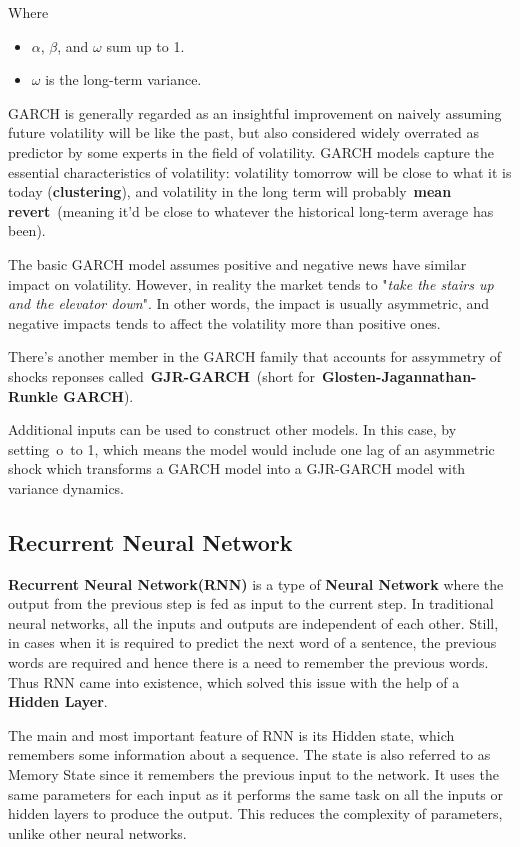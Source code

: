 \documentclass{ieeeojies}
\begin{document}
Where
\begin{itemize}
    \item $\alpha$, $\beta$, and $\omega$ sum up to 1.
    \item $\omega$ is the long-term variance.
\end{itemize}

GARCH is generally regarded as an insightful improvement on naively assuming future volatility will be like the past, but also considered widely overrated as predictor by some experts in the field of volatility. GARCH models capture the essential characteristics of volatility: volatility tomorrow will be close to what it is today (\textbf{clustering}), and volatility in the long term will probably \textbf{mean revert} (meaning it'd be close to whatever the historical long-term average has been). 

The basic GARCH model assumes positive and negative news have similar impact on volatility. However, in reality the market tends to "\textit{take the stairs up and the elevator down}". In other words, the impact is usually asymmetric, and negative impacts tends to affect the volatility more than positive ones.

There's another member in the GARCH family that accounts for assymmetry of shocks reponses called \textbf{GJR-GARCH} (short for \textbf{Glosten-Jagannathan-Runkle GARCH}).

Additional inputs can be used to construct other models. In this case, by setting o to 1, which means the model would include one lag of an asymmetric shock which transforms a GARCH model into a GJR-GARCH model with variance dynamics.
\subsection{Recurrent Neural Network}
\textbf{Recurrent Neural Network(RNN)} is a type of \textbf{Neural Network} where the output from the previous step is fed as input to the current step. In traditional neural networks, all the inputs and outputs are independent of each other. Still, in cases when it is required to predict the next word of a sentence, the previous words are required and hence there is a need to remember the previous words. Thus RNN came into existence, which solved this issue with the help of a \textbf{Hidden Layer}.
  
The main and most important feature of RNN is its Hidden state, which remembers some information about a sequence. The state is also referred to as Memory State since it remembers the previous input to the network. It uses the same parameters for each input as it performs the same task on all the inputs or hidden layers to produce the output. This reduces the complexity of parameters, unlike other neural networks.
\end{document}
